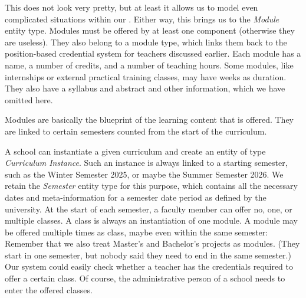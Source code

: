 \emph{}

This does not look very pretty, but at least it allows us to model even complicated situations within our \db.
Either way, this brings us to the \emph{Module} entity type.
Modules must be offered by at least one component (otherwise they are useless).
They also belong to a module type, which links them back to the position-based credential system for teachers discussed earlier.
Each module has a name, a number of credits, and a number of teaching hours.
Some modules, like internships or external practical training classes, may have weeks as duration.
They also have a syllabus and abstract and other information, which we have omitted here.

Modules are basically the blueprint of the learning content that is offered.
They are linked to certain semesters counted from the start of the curriculum.

A school can instantiate a given curriculum and create an entity of type \emph{Curriculum Instance}.
Such an instance is always linked to a starting semester, such as the Winter Semester 2025, or maybe the Summer Semester 2026.
We retain the \emph{Semester} entity type for this purpose, which contains all the necessary dates and meta-information for a semester date period as defined by the university.
At the start of each semester, a faculty member can offer no, one, or multiple classes.
A class is always an instantiation of one module.
A module may be offered multiple times as class, maybe even within the same semester:
Remember that we also treat Master's and Bachelor's projects as modules.
(They start in one semester, but nobody said they need to end in the same semester.)
Our system could easily check whether a teacher has the credentials required to offer a certain class.
Of course, the administrative person of a school needs to enter the offered classes.


